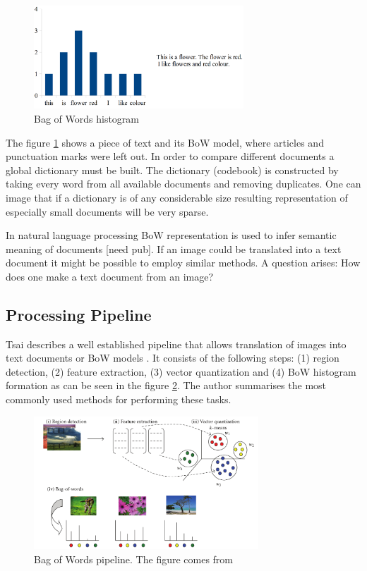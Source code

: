 	\begin{figure}[!ht]
	\centering
	\includegraphics[width=0.7\textwidth]{figs/bow_example}
	\caption{Bag of Words histogram}
	\label{fig:bow_example}
	\end{figure}
	
	The figure \ref{fig:bow_example} shows a piece of text and its BoW model, where articles and punctuation marks were left out. In order to compare different documents a global dictionary must be built. The dictionary (codebook) is constructed by taking every word from all available documents and removing duplicates. One can image that if a dictionary is of any considerable size resulting representation of especially small documents will be very sparse.

	In natural language processing BoW representation is used to infer semantic meaning of documents [need pub]. If an image could be translated into a text document it might be possible to employ similar methods. A question arises: How does one make a text document from an image?

	\subsection{Processing Pipeline}	
	Tsai describes a well established pipeline that allows translation of images into text documents or BoW models \cite{tsai2012bag}. It consists of the following steps: (1) region detection, (2) feature extraction, (3) vector quantization and (4) BoW histogram formation as can be seen in the figure \ref{fig:bow_pipeline}. The author summarises the most commonly used methods for performing these tasks. 
	
	\begin{figure}[!ht]
	\centering
	\includegraphics[width=0.75\textwidth]{figs/tsai2012}
	\caption{Bag of Words pipeline. The figure comes from \cite{tsai2012bag}}
	\label{fig:bow_pipeline}
	\end{figure}
	
